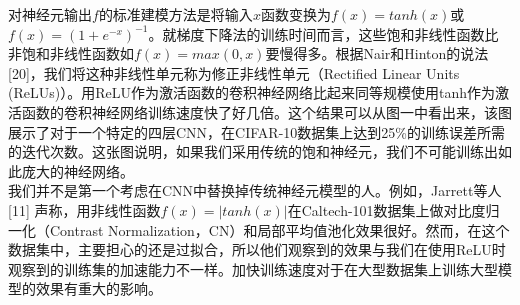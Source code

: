 对神经元输出$f$的标准建模方法是将输入$x$函数变换为$f(x) = tanh(x)$或$f(x) = (1+e^{-x})^{-1}$。就梯度下降法的训练时间而言，这些饱和非线性函数比非饱和非线性函数如$f(x)=max(0,x)$要慢得多。根据Nair和Hinton的说法[20]，我们将这种非线性单元称为修正非线性单元（Rectified Linear Units (ReLUs)）。用ReLU作为激活函数的卷积神经网络比起来同等规模使用tanh作为激活函数的卷积神经网络训练速度快了好几倍。这个结果可以从图一中看出来，该图展示了对于一个特定的四层CNN，在CIFAR-10数据集上达到25\%的训练误差所需的迭代次数。这张图说明，如果我们采用传统的饱和神经元，我们不可能训练出如此庞大的神经网络。\\

我们并不是第一个考虑在CNN中替换掉传统神经元模型的人。例如，Jarrett等人[11] 声称，用非线性函数$f(x)=|tanh(x)|$在Caltech-101数据集上做对比度归一化（Contrast Normalization，CN）和局部平均值池化效果很好。然而，在这个数据集中，主要担心的还是过拟合，所以他们观察到的效果与我们在使用ReLU时观察到的训练集的加速能力不一样。加快训练速度对于在大型数据集上训练大型模型的效果有重大的影响。